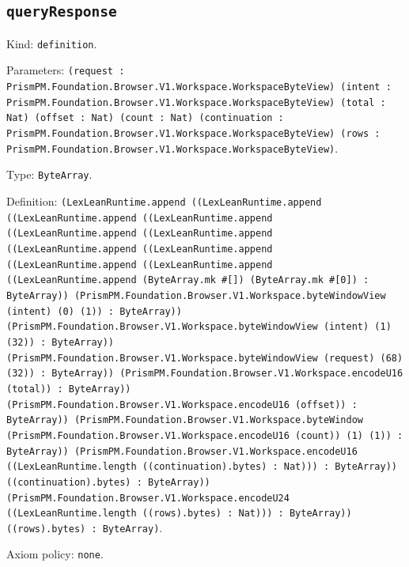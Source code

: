 \documentclass[11pt]{article}
\begin{document}
\subsection*{\texttt{queryResponse}}
\noindent Kind: \texttt{definition}.\par
\noindent Parameters: \texttt{(request : PrismPM.Foundation.Browser.V1.Workspace.WorkspaceByteView) (intent : PrismPM.Foundation.Browser.V1.Workspace.WorkspaceByteView) (total : Nat) (offset : Nat) (count : Nat) (continuation : PrismPM.Foundation.Browser.V1.Workspace.WorkspaceByteView) (rows : PrismPM.Foundation.Browser.V1.Workspace.WorkspaceByteView)}.\par
\noindent Type: \texttt{ByteArray}.\par
\noindent Definition: \texttt{(LexLeanRuntime.append ((LexLeanRuntime.append ((LexLeanRuntime.append ((LexLeanRuntime.append ((LexLeanRuntime.append ((LexLeanRuntime.append ((LexLeanRuntime.append ((LexLeanRuntime.append ((LexLeanRuntime.append ((LexLeanRuntime.append ((LexLeanRuntime.append (ByteArray.mk \#[]) (ByteArray.mk \#[0]) : ByteArray)) (PrismPM.Foundation.Browser.V1.Workspace.byteWindowView (intent) (0) (1)) : ByteArray)) (PrismPM.Foundation.Browser.V1.Workspace.byteWindowView (intent) (1) (32)) : ByteArray)) (PrismPM.Foundation.Browser.V1.Workspace.byteWindowView (request) (68) (32)) : ByteArray)) (PrismPM.Foundation.Browser.V1.Workspace.encodeU16 (total)) : ByteArray)) (PrismPM.Foundation.Browser.V1.Workspace.encodeU16 (offset)) : ByteArray)) (PrismPM.Foundation.Browser.V1.Workspace.byteWindow (PrismPM.Foundation.Browser.V1.Workspace.encodeU16 (count)) (1) (1)) : ByteArray)) (PrismPM.Foundation.Browser.V1.Workspace.encodeU16 ((LexLeanRuntime.length ((continuation).bytes) : Nat))) : ByteArray)) ((continuation).bytes) : ByteArray)) (PrismPM.Foundation.Browser.V1.Workspace.encodeU24 ((LexLeanRuntime.length ((rows).bytes) : Nat))) : ByteArray)) ((rows).bytes) : ByteArray)}.\par
\noindent Axiom policy: \texttt{none}.\par
\end{document}
